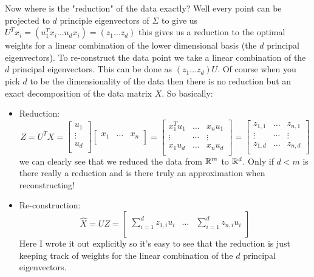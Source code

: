 		 Now where is the "reduction" of the data exactly? Well every point can be projected to $d$ principle eigenvectors of $\Sigma$ to give us $U^T x_i = (u_1^Tx_i \dots u_dx_i) = (z_1 \dots z_d)$ this gives us a reduction to the optimal weights for a linear combination of the lower dimensional basis (the $d$ principal eigenvectors). To re-construct the data point we take a linear combination of the $d$ principal eigenvectors. This can be done as $(z_1 \dots z_d)U$. Of course when you pick $d$ to be the dimensionality of the data then there is no reduction but an exact decomposition of the data matrix $X$. So basically:
		 \begin{itemize}
		 	\item Reduction: \begin{equation}
		 	Z = U^T X= \begin{bmatrix}
		 	u_1\\
		 	\vdots\\
		 	u_d\\
		 	\end{bmatrix}
		 	\begin{bmatrix}
		 	x_1&
		 	\dots&
		 	x_n\\
		 	\end{bmatrix} = 
		 	\begin{bmatrix}
		 	x_1^Tu_1 & \dots& x_nu_1\\
		 	\vdots& \cdots & \vdots\\
		 	x_1u_d & \dots & x_nu_d\\
		 	\end{bmatrix} = \begin{bmatrix}
		 	z_{1,1} & \dots& z_{n,1}\\
		 	\vdots& \cdots & \vdots\\
		 	z_{1,d} & \dots & z_{n,d}\\
		 	\end{bmatrix}
		 	\end{equation}
		 	we can clearly see that we reduced the data from $\mathbb{R}^m$ to $\mathbb{R}^d$. Only if $d < m$ is there really a reduction and is there truly an approximation when reconstructing!
		 	\item Re-construction:
		 	\begin{equation}
		 	\hat{X} = UZ = \begin{bmatrix} 
		 	\sum_{i=1}^{d}z_{1,i}u_i & \dots & \sum_{i=1}^{d}z_{n,i}u_i \\
		 	\end{bmatrix}
		 	\end{equation}
		 	Here I wrote it out explicitly so it's easy to see that the reduction is just keeping track of weights for the linear combination of the $d$ principal eigenvectors.
		 \end{itemize}
